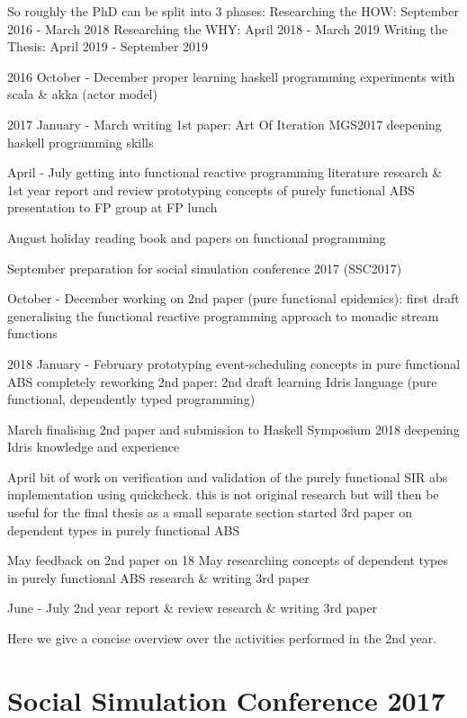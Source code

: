 So roughly the PhD can be split into 3 phases:
Researching the HOW: September 2016 - March 2018
Researching the WHY: April 2018 - March 2019
Writing the Thesis: April 2019 - September 2019

2016
October - December
	proper learning haskell programming
	experiments with scala \& akka (actor model)
	
2017
January - March
	writing 1st paper: Art Of Iteration
	MGS2017
	deepening haskell programming skills

April - July
	getting into functional reactive programming
	literature research \& 1st year report and review
	prototyping concepts of purely functional ABS
	presentation to FP group at FP lunch

August
	holiday
	reading book and papers on functional programming

September
	preparation for social simulation conference 2017 (SSC2017)

October - December
	working on 2nd paper (pure functional epidemics): first draft
	generalising the functional reactive programming approach to monadic stream functions 

2018
January - February
	prototyping event-scheduling concepts in pure functional ABS
	completely reworking 2nd paper: 2nd draft
	learning Idris language (pure functional, dependently typed programming)

March
	finalising 2nd paper and submission to Haskell Symposium 2018
	deepening Idris knowledge and experience 

April
	bit of work on verification and validation of the purely functional SIR abs implementation using quickcheck. this is not original research but will then be useful for the final thesis as a small separate section
	started 3rd paper on dependent types in purely functional ABS

May
	feedback on 2nd paper on 18 May	
	researching concepts of dependent types in purely functional ABS
	research \& writing 3rd paper

June - July
	2nd year report \& review
	research \& writing 3rd paper




Here we give a concise overview over the activities performed in the 2nd year.

\section{Social Simulation Conference 2017}


